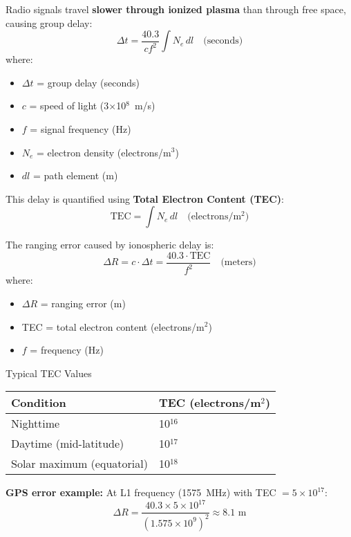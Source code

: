 Radio signals travel \textbf{slower through ionized plasma} than through free space, causing group delay:
\begin{equation}
\Delta t = \frac{40.3}{c f^2} \int N_e \, dl \quad \text{(seconds)}
\end{equation}
where:
\begin{itemize}
\item $\Delta t$ = group delay (seconds)
\item $c$ = speed of light (3$\times$10$^8$~m/s)
\item $f$ = signal frequency (Hz)
\item $N_e$ = electron density (electrons/m$^3$)
\item $dl$ = path element (m)
\end{itemize}

This delay is quantified using \textbf{Total Electron Content (TEC)}:
\begin{equation}
\text{TEC} = \int N_e \, dl \quad \text{(electrons/m$^2$)}
\end{equation}

The ranging error caused by ionospheric delay is:
\begin{equation}
\Delta R = c \cdot \Delta t = \frac{40.3 \cdot \text{TEC}}{f^2} \quad \text{(meters)}
\end{equation}
where:
\begin{itemize}
\item $\Delta R$ = ranging error (m)
\item TEC = total electron content (electrons/m$^2$)
\item $f$ = frequency (Hz)
\end{itemize}

\begin{calloutbox}{Typical TEC Values}
\begin{tabular}{@{}ll@{}}
\toprule
Condition & TEC (electrons/m$^2$) \\
\midrule
Nighttime & 10$^{16}$ \\
Daytime (mid-latitude) & 10$^{17}$ \\
Solar maximum (equatorial) & 10$^{18}$ \\
\bottomrule
\end{tabular}
\end{calloutbox}

\textbf{GPS error example:} At L1 frequency (1575~MHz) with TEC $= 5 \times 10^{17}$:
\begin{equation}
\Delta R = \frac{40.3 \times 5 \times 10^{17}}{(1.575 \times 10^9)^2} \approx 8.1\text{~m}
\end{equation}

